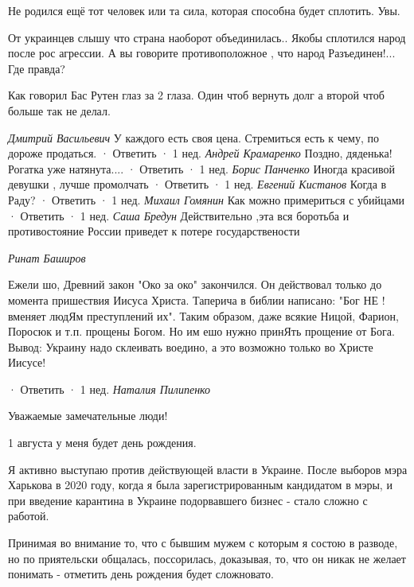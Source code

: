Не родился ещё тот человек или та сила, которая способна будет сплотить. Увы.


От украинцев слышу что страна наоборот объединилась.. Якобы сплотился народ
после рос агрессии. А вы говорите противоположное , что народ Разъединен!...
Где правда?


 

Как говорил Бас Рутен глаз за 2 глаза. Один чтоб вернуть долг а второй чтоб
больше так не делал.

\emph{Дмитрий Васильевич}
У каждого есть своя цена. Стремиться есть к чему, по дороже продаться.
 · Ответить · 1 нед.
\emph{Андрей Крамаренко}
Поздно, дяденька! Рогатка уже натянута....
 · Ответить · 1 нед.
\emph{Борис Панченко}
Иногда красивой девушки , лучше промолчать
 · Ответить · 1 нед.
\emph{Евгений Кистанов}
Когда в Раду?
 · Ответить · 1 нед.
\emph{Михаил Гомянин}
Как можно примериться с убийцами
 · Ответить · 1 нед.
\emph{Саша Бредун}
Действительно ,эта вся боротьба и противостояние России приведет к потере государствености

\emph{Ринат Баширов}

Ежели шо, Древний закон "Око за око" закончился. Он действовал только до
момента пришествия Иисуса Христа. Таперича в библии написано: "Бог НЕ ! вменяет
людЯм преступлений их". Таким образом, даже всякие Ницой, Фарион, Поросюк и
т.п. прощены Богом. Но им ешо нужно принЯть прощение от Бога. Вывод: Украину
надо склеивать воедино, а это возможно только во Христе Иисусе!

 · Ответить · 1 нед.
\emph{Наталия Пилипенко}

Уважаемые замечательные люди!

1 августа у меня будет день рождения.

Я активно выступаю против действующей власти в Украине. После выборов мэра
Харькова в 2020 году, когда я была зарегистрированным кандидатом в мэры, и при
введение карантина в Украине подорвавшего бизнес - стало сложно с работой.

Принимая во внимание то, что с бывшим мужем с которым я состою в разводе, но по
приятельски общалась, поссорилась, доказывая, то, что он никак не желает
понимать - отметить день рождения будет сложновато.

